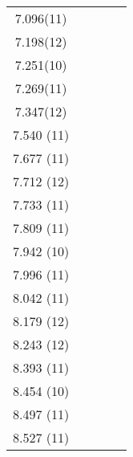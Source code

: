 \begin{center}
\begin{longtable}{cc cc c}
7.096(11)              &          &             &                               &               \\
7.198(12)              &          &             &                               &               \\
7.251(10)              &          &             &                               &               \\
7.269(11)              &          &             &                               &               \\
7.347(12)              &          &             &                               &               \\
  7.540 (11)           &          &             &                               &               \\
  7.677 (11)           &          &             &                               &               \\
  7.712 (12)           &          &             &                               &               \\
  7.733 (11)           &          &             &                               &               \\
  7.809 (11)           &          &             &                               &               \\
  7.942 (10)           &          &             &                               &               \\
  7.996 (11)           &          &             &                               &               \\
  8.042 (11)           &          &             &                               &               \\
  8.179 (12)           &          &             &                               &               \\
  8.243 (12)           &          &             &                               &               \\
  8.393 (11)           &          &             &                               &               \\
  8.454 (10)           &          &             &                               &               \\
  8.497 (11)           &          &             &                               &               \\
  8.527 (11)           &          &             &                               &               \\

\end{longtable}
\end{center}
